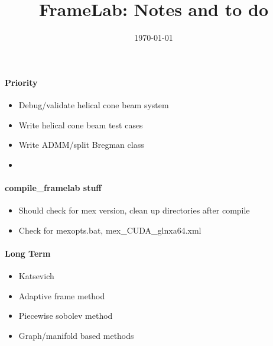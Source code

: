 \documentclass[12pt]{article}
\title{FrameLab: Notes and to do}
\date{\today}
\begin{document}
\maketitle


\paragraph{Priority}
\begin{itemize}
\item Debug/validate helical cone beam system 
\item Write helical cone beam test cases
\item Write ADMM/split Bregman class
\item 
\end{itemize}


\paragraph{compile\_framelab stuff}
\begin{itemize}
\item Should check for mex version, clean up directories after compile
\item Check for mexopts.bat, mex\_CUDA\_glnxa64.xml
\end{itemize}


\paragraph{Long Term}
\begin{itemize}
\item Katsevich
\item Adaptive frame method
\item Piecewise sobolev method 
\item Graph/manifold based methods 
\end{itemize}



\end{document}
